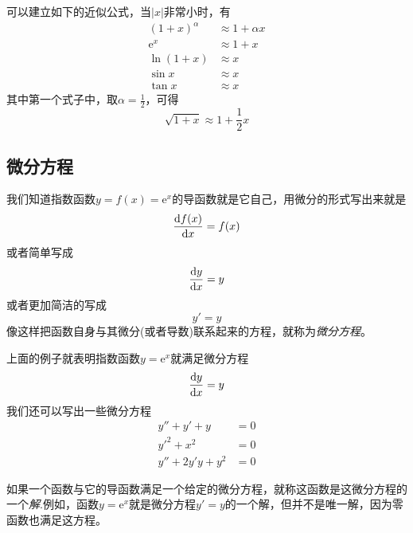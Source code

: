 \begin{example}
  可以建立如下的近似公式，当$|x|$非常小时，有
  \begin{align*}
    (1+x)^{\alpha} & \approx 1 + \alpha x \\
    \mathrm{e}^x & \approx 1 + x \\
    \ln{(1+x)} & \approx x \\
    \sin{x} & \approx x \\
    \tan{x} & \approx x
  \end{align*}
  其中第一个式子中，取$\alpha=\frac{1}{2}$，可得
    \[ \sqrt{1+x} \approx 1 + \frac{1}{2}x \]
\end{example}

\subsection{微分方程}
\label{sec:differtial-equation}

我们知道指数函数$y=f(x)=\mathrm{e}^x$的导函数就是它自己，用微分的形式写出来就是
\[ \frac{\mathop{}\!\mathrm{d} f(x)}{\mathop{}\!\mathrm{d} x} = f(x) \]
或者简单写成
\[ \frac{\mathop{}\!\mathrm{d} y}{\mathop{}\!\mathrm{d} x} = y \]
或者更加简洁的写成
\[ y'=y \]
像这样把函数自身与其微分(或者导数)联系起来的方程，就称为\emph{微分方程}。

上面的例子就表明指数函数$y=\mathrm{e}^x$就满足微分方程
\[ \frac{\mathop{}\!\mathrm{d} y}{\mathop{}\!\mathrm{d} x} = y \]
我们还可以写出一些微分方程
\begin{align*}
  y''+y'+y&=0 \\
  y'^2+x^2&=0 \\
  y''+2y'y+y^2& = 0
\end{align*}

如果一个函数与它的导函数满足一个给定的微分方程，就称这函数是这微分方程的一个\emph{解}.例如，函数$y=\mathrm{e}^x$就是微分方程$y'=y$的一个解，但并不是唯一解，因为零函数也满足这方程。



